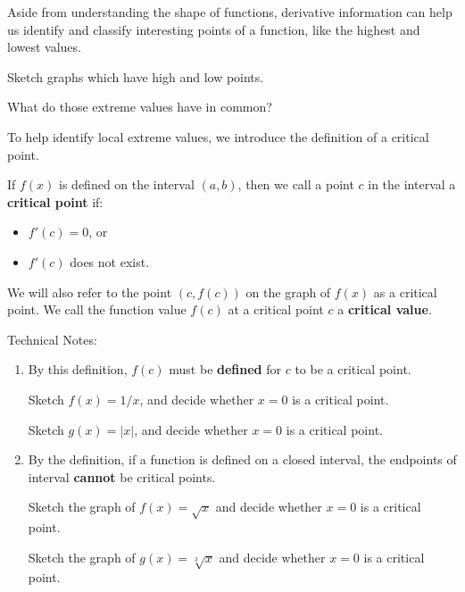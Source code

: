 Aside from understanding the shape of functions, derivative
information can help us identify and classify interesting points of a
function, like the highest and lowest values.

\problem Sketch graphs which have high and low points.  

\vfill 

What do those extreme values have in common?


\newpage

To help identify local extreme values, we introduce the definition of
a critical point.

\begin{boxnote}

  If $f(x)$ is defined on the interval $(a,b)$, then we call a point
  $c$ in the interval a {\bf critical point} if:
\begin{itemize}
	\item $f'(c) = 0$, or
	\item $f'(c)$ does not exist.
\end{itemize}
We will also refer to the point $(c,f(c))$ on the graph of $f(x)$ as a
critical point.  We call the function value $f(c)$ at a critical point
$c$ a {\bf critical value}.

\vsc
\end{boxnote}

\newpage

Technical Notes:
\begin{enumerate} 
\item By this definition, $f(c)$ must be {\bf defined} for
  $c$ to be a critical point.  

\problem   Sketch $f(x) = 1/x$, and decide whether $x=0$ is a
    critical point.

\vfill
  Sketch $g(x) = |x|$, and decide whether $x=0$ is a
    critical point.

\vfill

\newpage

\item By the definition, if a function is defined on a closed
  interval, the endpoints of interval {\bf cannot} be critical points.

\problem   Sketch the graph of $f(x) = \sqrt{x}$ and decide
    whether $x=0$ is a critical point.

\vfill

\newpage

\problem Sketch the graph of $g(x) = \sqrt[3]{x}$ and decide
  whether $x=0$ is a critical point.

\vfill

\end{enumerate}

